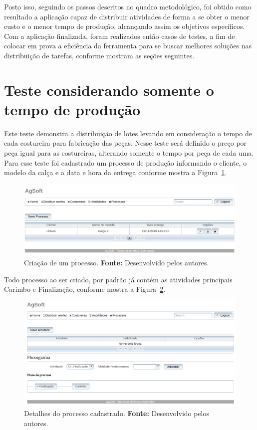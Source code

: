 \par Posto isso, seguindo os passos descritos no quadro metodológico, foi obtido como resultado a aplicação
capaz de distribuir atividades de forma a se obter o menor custo e o menor tempo de produção, 
alcançando assim os objetivos específicos. Com a aplicação finalizada, foram realizados então casos de 
testes, a fim de colocar em prova a eficiência da ferramenta para se buscar melhores soluções nas distribuição 
de tarefas, conforme mostram as seções seguintes.


\section{Teste considerando somente o tempo de produção}

\par Este teste demonstra a distribuição de lotes levando em consideração o
tempo de cada costureira para fabricação das peças. Nesse teste será definido o
preço por peça igual para as costureiras, alterando somente o tempo por peça de
cada uma. Para esse teste foi cadastrado um processo de produção informando o
cliente, o modelo da calça e a data e hora da entrega conforme mostra a Figura~\ref{fig:cad_processo1}.

\begin{figure}[h!]
	\centerline{\includegraphics[width=14.7cm]{./imagens/teste_processo.png}}
	\caption[Criação de um processo.]
	{Criação de um processo. \textbf{Fonte:} Desenvolvido pelos autores.}
	\label{fig:cad_processo1}
\end{figure}

\par Todo processo ao ser criado, por padrão já contém as atividades principais
 Carimbo e Finalização, conforme mostra a Figura~\ref{fig:processo_cadastrado}.


\begin{figure}[h!]
	\centerline{\includegraphics[width=13cm]{./imagens/tela_processo_teste1.png}}
	\caption[Detalhes do processo cadastrado.]
	{Detalhes do processo cadastrado. \textbf{Fonte:} Desenvolvido pelos autores.}
	\label{fig:processo_cadastrado}
\end{figure}

